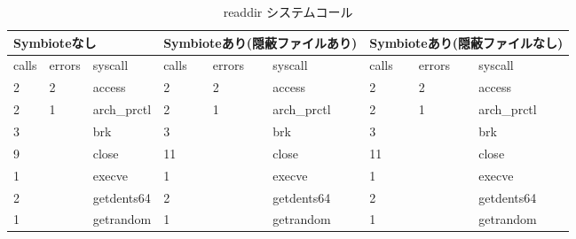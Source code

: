 \documentclass[submit,techreq,noauthor]{eco}	%
\begin{document}
\begin{table}[t]
  \centering
  \caption{readdir システムコール}
  \label{table: readdir}
  \begin{tabular}{|lll|lll|lll|}
  \hline
  \multicolumn{3}{|l|}{Symbioteなし}                                              & \multicolumn{3}{l|}{Symbioteあり(隠蔽ファイルあり)}                                              & \multicolumn{3}{l|}{Symbioteあり(隠蔽ファイルなし)}                                    \\ \hline
  \multicolumn{1}{|l|}{calls} & \multicolumn{1}{l|}{errors} & syscall           & \multicolumn{1}{l|}{calls} & \multicolumn{1}{l|}{errors} & syscall           & \multicolumn{1}{l|}{calls} & \multicolumn{1}{l|}{errors} & syscall           \\ \hline
  \multicolumn{1}{|l|}{2}     & \multicolumn{1}{l|}{2}      & access            & \multicolumn{1}{l|}{2}     & \multicolumn{1}{l|}{2}      & access            & \multicolumn{1}{l|}{2}     & \multicolumn{1}{l|}{2}      & access            \\
  \multicolumn{1}{|l|}{2}     & \multicolumn{1}{l|}{1}      & arch\_prctl       & \multicolumn{1}{l|}{2}     & \multicolumn{1}{l|}{1}      & arch\_prctl       & \multicolumn{1}{l|}{2}     & \multicolumn{1}{l|}{1}      & arch\_prctl       \\
  \multicolumn{1}{|l|}{3}     & \multicolumn{1}{l|}{}       & brk               & \multicolumn{1}{l|}{3}     & \multicolumn{1}{l|}{}       & brk               & \multicolumn{1}{l|}{3}     & \multicolumn{1}{l|}{}       & brk               \\
  \multicolumn{1}{|l|}{9}     & \multicolumn{1}{l|}{}       & close             & \multicolumn{1}{l|}{11}    & \multicolumn{1}{l|}{}       & close             & \multicolumn{1}{l|}{11}    & \multicolumn{1}{l|}{}       & close             \\
  \multicolumn{1}{|l|}{1}     & \multicolumn{1}{l|}{}       & execve            & \multicolumn{1}{l|}{1}     & \multicolumn{1}{l|}{}       & execve            & \multicolumn{1}{l|}{1}     & \multicolumn{1}{l|}{}       & execve            \\
  \multicolumn{1}{|l|}{2}     & \multicolumn{1}{l|}{}       & getdents64        & \multicolumn{1}{l|}{2}     & \multicolumn{1}{l|}{}       & getdents64        & \multicolumn{1}{l|}{2}     & \multicolumn{1}{l|}{}       & getdents64        \\
  \multicolumn{1}{|l|}{1}     & \multicolumn{1}{l|}{}       & getrandom         & \multicolumn{1}{l|}{1}     & \multicolumn{1}{l|}{}       & getrandom         & \multicolumn{1}{l|}{1}     & \multicolumn{1}{l|}{}       & getrandom         \\

\end{tabular}
\end{table}
\end{document}
